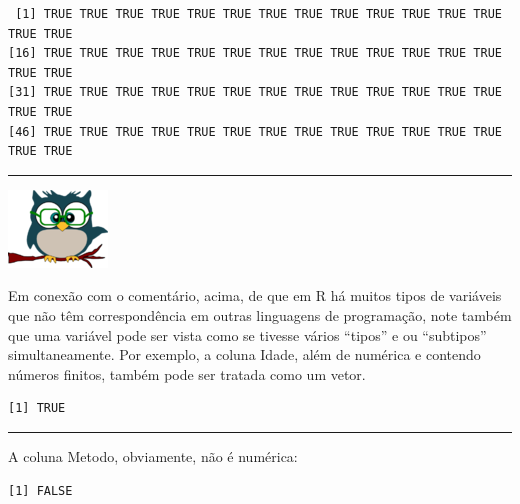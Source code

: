 \documentclass[
]{article}
\newenvironment{Shaded}{\begin{snugshade}}{\end{snugshade}}
\newcommand{\FunctionTok}[1]{\textcolor[rgb]{0.00,0.00,0.00}{#1}}
\newcommand{\NormalTok}[1]{#1}
\newcommand{\SpecialCharTok}[1]{\textcolor[rgb]{0.00,0.00,0.00}{#1}}
\begin{document}
\begin{verbatim}
 [1] TRUE TRUE TRUE TRUE TRUE TRUE TRUE TRUE TRUE TRUE TRUE TRUE TRUE TRUE TRUE
[16] TRUE TRUE TRUE TRUE TRUE TRUE TRUE TRUE TRUE TRUE TRUE TRUE TRUE TRUE TRUE
[31] TRUE TRUE TRUE TRUE TRUE TRUE TRUE TRUE TRUE TRUE TRUE TRUE TRUE TRUE TRUE
[46] TRUE TRUE TRUE TRUE TRUE TRUE TRUE TRUE TRUE TRUE TRUE TRUE TRUE TRUE TRUE
\end{verbatim}

\begin{center}\rule{0.5\linewidth}{0.5pt}\end{center}

\begin{flushleft}\includegraphics[width=0.08\linewidth]{coruja} \end{flushleft}

Em conexão com o comentário, acima, de que em R há muitos tipos de
variáveis que não têm correspondência em outras linguagens de
programação, note também que uma variável pode ser vista como se tivesse
vários ``tipos'' e ou ``subtipos'' simultaneamente. Por exemplo, a
coluna Idade, além de numérica e contendo números finitos, também pode
ser tratada como um vetor.

\begin{Shaded}
\end{Shaded}

\begin{verbatim}
[1] TRUE
\end{verbatim}

\begin{center}\rule{0.5\linewidth}{0.5pt}\end{center}

A coluna Metodo, obviamente, não é numérica:

\begin{Shaded}
\end{Shaded}

\begin{verbatim}
[1] FALSE
\end{verbatim}
\end{document}
